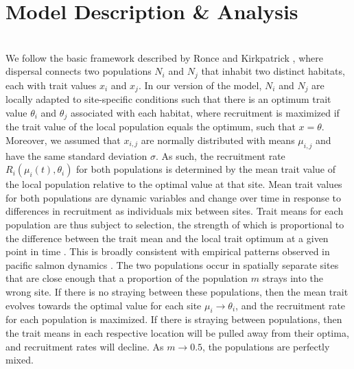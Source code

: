 \documentclass{revtex4}
\begin{document}
\section{Model Description \& Analysis}

\\
\noindent We follow the basic framework described by Ronce and Kirkpatrick \citep{Ronce:2001dp}, where dispersal connects two populations $N_i$ and $N_j$ that inhabit two distinct habitats, each with trait values $x_i$ and $x_j$.
In our version of the model, $N_i$ and $N_j$ are locally adapted to site-specific conditions such that there is an optimum trait value $\theta_i$ and $\theta_j$ associated with each habitat, where recruitment is maximized if the trait value of the local population equals the optimum, such that $x = \theta$.
Moreover, we assumed that $x_{i,j}$ are normally distributed with means $\mu_{i,j}$ and have the same standard deviation $\sigma$.
As such, the recruitment rate $R_i(\mu_i(t),\theta_i)$ for both populations is determined by the mean trait value of the local population relative to the optimal value at that site.
Mean trait values for both populations are dynamic variables and change over time in response to differences in recruitment as individuals mix between sites.
Trait means for each population are thus subject to selection, the strength of which is proportional to the difference between the trait mean and the local trait optimum at a given point in time \citep{simpson1953major,Lande:1976ga,Ronce:2001dp}.
This is broadly consistent with empirical patterns observed in pacific salmon dynamics \citep{Reisenbichler:1988ex}.
The two populations occur in spatially separate sites that are close enough that a proportion of the population $m$ strays into the wrong site.
If there is no straying between these populations, then the mean trait evolves towards the optimal value for each site $\mu_i \rightarrow \theta_i$, and the recruitment rate for each population is maximized.
If there is straying between populations, then the trait means in each respective location will be pulled away from their optima, and recruitment rates will decline.
As $m \rightarrow 0.5$, the populations are perfectly mixed.
\end{document}
